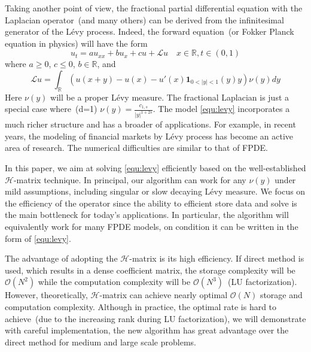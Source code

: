 \documentclass[10pt,a4paper]{article}
\newcommand{\RR}[0]{\mathbb{R}}
\theoremstyle{definition}
\begin{document}
Taking another point of view, the fractional partial differential equation with the Laplacian operator~(and many others) can be derived from the infinitesimal generator of the L\'evy process. Indeed, the forward equation~(or Fokker Planck equation in physics) will have the form
\begin{equation}\label{equ:levy}
	u_t = a u_{xx} + bu_x + cu + \mathcal{L}u\quad x\in \RR, t\in (0,1)
\end{equation}
where $a\geq 0$, $c\leq 0$, $b\in\RR$, and
\begin{equation}
	\mathcal{L}u = \int_\RR (u(x+y)-u(x)-u'(x)\mathbf{1}_{0<|y|<1}(y)y)\nu(y)dy
\end{equation}  
Here $\nu(y)$ will be a proper L\'evy measure. The fractional Laplacian is just a special case where~(d=1) $\nu(y) = \frac{c_{1,s}}{|y|^{1+2s}}$. The model \cref{equ:levy} incorporates a much richer structure and has a broader of applications. For example, in recent years, the modeling of financial markets by L\'evy process has become an active area of research. The numerical difficulties are similar to that of FPDE. 

In this paper, we aim at solving \cref{equ:levy} efficiently based on the well-established $\mathcal{H}$-matrix technique. In principal, our algorithm can work for any $\nu(y)$ under mild assumptions, including singular or slow decaying L\'evy measure. We focus on the efficiency of the operator since the ability to efficient store data and solve is the main bottleneck for today's applications. In particular, the algorithm will equivalently work for many FPDE models, on condition it can be written in the form of \cref{equ:levy}. 

The advantage of adopting the $\mathcal{H}$-matrix is its high efficiency. If direct method is used, which results in a dense coefficient matrix, the storage complexity will be $\mathcal{O}(N^2)$ while the computation complexity will be $\mathcal{O}(N^3)$~(LU factorization). However, theoretically, $\mathcal{H}$-matrix can achieve nearly optimal $\mathcal{O}(N)$ storage and computation complexity. Although in practice, the optimal rate is hard to achieve~(due to the increasing rank during LU factorization), we will demonstrate with careful implementation, the new algorithm has great advantage over the direct method for medium and large scale problems. 
\end{document}
